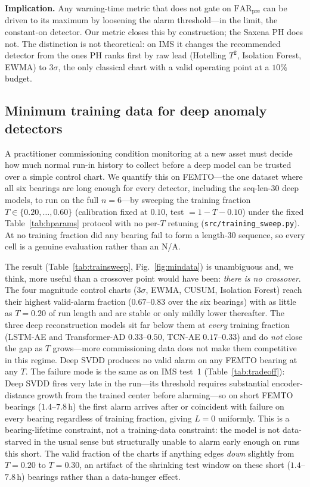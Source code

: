 \documentclass[journal]{IEEEtran}
\begin{document}
\textbf{Implication.} Any warning-time metric that does not gate on
$\mathrm{FAR}_{\mathrm{pre}}$ can be driven to its maximum by loosening the alarm
threshold---in the limit, the constant-on detector. Our metric closes this by
construction; the Saxena PH does not. The distinction is not theoretical: on IMS it
changes the recommended detector from the ones PH ranks first by raw lead (Hotelling
$T^2$, Isolation Forest, EWMA) to 3$\sigma$, the only classical chart with a valid
operating point at a $10\%$ budget.

\subsection{Minimum training data for deep anomaly detectors}
\label{sec:mindata}
A practitioner commissioning condition monitoring at a new asset must decide how much
normal run-in history to collect before a deep model can be trusted over a simple
control chart. We quantify this on FEMTO---the one dataset where all six bearings are
long enough for every detector, including the seq-len-30 deep models, to run on the
full $n{=}6$---by sweeping the training fraction $T\in\{0.20,\dots,0.60\}$ (calibration
fixed at $0.10$, test $=1-T-0.10$) under the fixed Table~\ref{tab:hparams} protocol with
no per-$T$ retuning (\texttt{src/training\_sweep.py}). At no training fraction did any
bearing fail to form a length-30 sequence, so every cell is a genuine evaluation rather
than an N/A.

The result (Table~\ref{tab:trainsweep}, Fig.~\ref{fig:mindata}) is unambiguous and, we
think, more useful than a crossover point would have been: \emph{there is no
crossover}. The four magnitude control charts (3$\sigma$, EWMA, CUSUM, Isolation
Forest) reach their highest valid-alarm fraction ($0.67$--$0.83$ over the six bearings)
with as little as $T{=}0.20$ of run length and are stable or only mildly lower
thereafter. The three deep reconstruction models sit far below them at \emph{every}
training fraction (LSTM-AE and Transformer-AD $0.33$--$0.50$, TCN-AE $0.17$--$0.33$) and
do \emph{not} close the gap as $T$ grows---more commissioning data does not make them
competitive in this regime. Deep SVDD produces no valid alarm on any FEMTO bearing at
any $T$. The failure mode is the same as on IMS test~1 (Table~\ref{tab:tradeoff}):
Deep SVDD fires very late in the run---its threshold requires substantial
encoder-distance growth from the trained center before alarming---so on short FEMTO
bearings ($1.4$--$7.8$\,h) the first alarm arrives after or coincident with failure on
every bearing regardless of training fraction, giving $L{=}0$ uniformly. This is a
bearing-lifetime constraint, not a training-data constraint: the model is not
data-starved in the usual sense but structurally unable to alarm early enough on runs
this short. The valid fraction of the charts if anything edges \emph{down} slightly from
$T{=}0.20$ to $T{=}0.30$, an artifact of the shrinking test window on these short
($1.4$--$7.8$\,h) bearings rather than a data-hunger effect.
\end{document}
